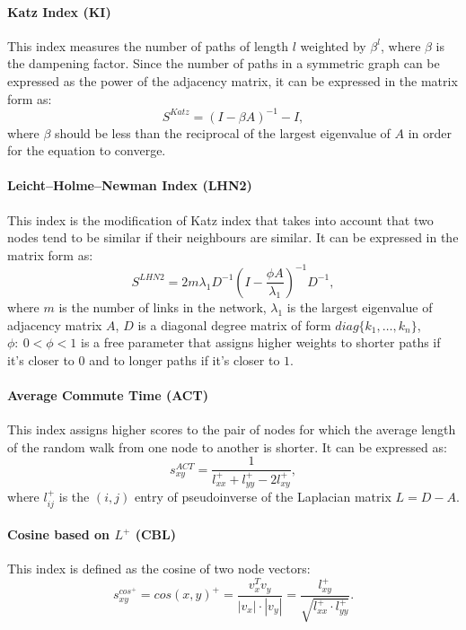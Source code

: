 \documentclass{llncs}
\begin{document}
\paragraph{Katz Index (KI) \cite{katz-index}}
%
This index measures the number of paths of length $l$ weighted by $\beta^l$, where $\beta$ is the dampening factor. Since the number of paths in a symmetric graph can be expressed as the power of the adjacency matrix, it can be expressed in the matrix form as:
\begin{equation}
S^{Katz} = (I - \beta A)^{-1} - I,
\end{equation}
where $\beta$ should be less than the reciprocal of the largest eigenvalue of $A$ in order for the equation to converge.
%
\paragraph{Leicht–Holme–Newman Index (LHN2) \cite{lhn1-index}}
%
This index is the modification of Katz index that takes into account that two nodes tend to be similar if their neighbours are similar. It can be expressed in the matrix form \cite{survey} as:
\begin{equation}
S^{LHN2} = 2 m \lambda_1 D^{-1} (I - \frac{\phi A}{\lambda_1})^{-1} D^{-1},
\end{equation}
where $m$ is the number of links in the network, $\lambda_1$ is the largest eigenvalue of adjacency matrix $A$, $D$ is a diagonal degree matrix of form $diag\{k_1, \ldots, k_n\}$, $\phi : \ 0 < \phi < 1$ is a free parameter that assigns higher weights to shorter paths if it's closer to $0$ and to longer paths if it's closer to $1$.
%
\paragraph{Average Commute Time (ACT)}
%
This index assigns higher scores to the pair of nodes for which the average length of the random walk from one node to another is shorter. It can be expressed as:
\begin{equation}
s_{xy}^{ACT} = \frac{1}{l_{xx}^{+} + l_{yy}^{+} - 2l_{xy}^{+}},
\end{equation}
where $l_{ij}^{+}$ is the $(i, j)$ entry of pseudoinverse of the Laplacian matrix $L = D - A$.
%
\paragraph{Cosine based on $L^+$ (CBL)}
%
This index is defined as the cosine of two node vectors:
\begin{equation}
s_{xy}^{cos^{+}} = cos(x, y)^{+} = \frac{v_x^T v_y}{|v_x| \cdot |v_y|} = \frac{l_{xy}^{+}}{\sqrt{l_{xx}^{+}\cdot l_{yy}^{+}}}.
\end{equation}
%
\end{document}
